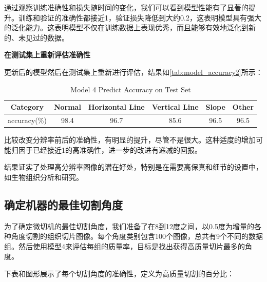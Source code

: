 通过观察训练准确性和损失随时间的变化，我们可以看到模型性能有了显著的提升。训练和验证的准确性都接近1，验证损失降低到大约0.2，这表明模型具有强大的泛化能力。这表明模型不仅在训练数据上表现优秀，而且能够有效地泛化到新的、未见过的数据。

\textbf{在测试集上重新评估准确性}

更新后的模型然后在测试集上重新进行评估，结果如\autoref{tab:model_accuracy2}所示：

\begin{table}[H]
    \centering
    \caption{Model 4 Predict Accuracy on Test Set}
    \begin{tabular}{cccccc}
        \toprule
        Category & Normal & Horizontal Line & Vertical Line & Slope & Other \\
        \midrule
        accuracy(\%) & 98.4 & 96.7 & 85.6 & 96.5 & 96.5 \\
        \bottomrule
    \end{tabular}
    \label{tab:model_accuracy2}
    \end{table}

比较改变分辨率前后的准确性，有明显的提升，尽管不是很大。这种适度的增加可能归因于已经接近1的高准确性，进一步的改进有递减的回报。

结果证实了处理高分辨率图像的潜在好处，特别是在需要高保真和细节的设置中，如生物组织分析和研究。

\subsection{确定机器的最佳切割角度}

为了确定微切机的最佳切割角度，我们准备了在8到12度之间，以0.5度为增量的各种角度切割的组织切片图像。每个角度类别包含100个图像，总共有9个不同的数据组。然后使用模型4来评估每组的质量率，目标是找出获得高质量切片最多的角度。

下表和图形展示了每个切割角度的准确性，定义为高质量切割的百分比：

